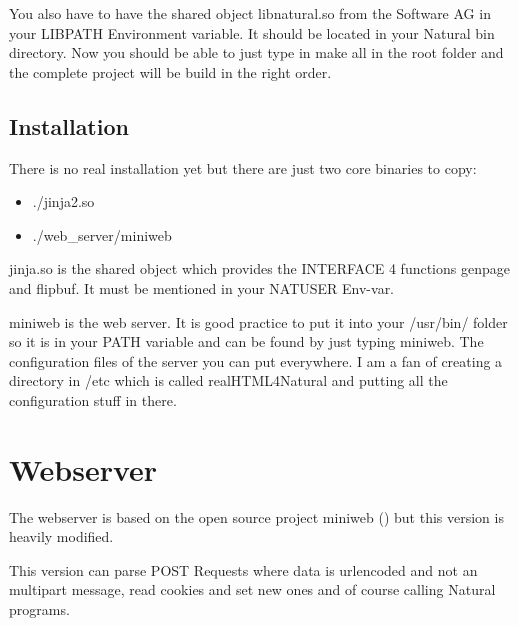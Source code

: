 \documentclass[letterpaper,10pt,english]{sphinxmanual}
\begin{document}
You also have to have the shared object \sphinxquotedblleft{}libnatural.so\sphinxquotedblright{} from the Software AG in your \sphinxquotedblleft{}LIBPATH\sphinxquotedblright{} Environment variable. It should be located in your Natural bin directory.
Now you should be able to just type in \sphinxquotedblleft{}make all\sphinxquotedblright{} in the root folder and the complete project will be build in the right order.


\subsection{Installation}
\label{\detokenize{installation:installation}}
There is no real installation yet but there are just two core binaries to copy:
\begin{itemize}
\item {} 
./jinja2.so

\item {} 
./web\_server/miniweb

\end{itemize}

\sphinxquotedblleft{}jinja.so\sphinxquotedblright{} is the shared object which provides the INTERFACE 4 functions \sphinxquotedblleft{}genpage\sphinxquotedblright{} and \sphinxquotedblleft{}flipbuf\sphinxquotedblright{}. It must be mentioned in your NATUSER Env-var.

\sphinxquotedblleft{}miniweb\sphinxquotedblright{} is the web server. It is good practice to put it into your \sphinxquotedblleft{}/usr/bin/\sphinxquotedblright{} folder so it is in your PATH variable and can be found by just typing \sphinxquotedblleft{}miniweb\sphinxquotedblright{}. The configuration files of the server you can put everywhere.
I am a fan of creating a directory in \sphinxquotedblleft{}/etc\sphinxquotedblright{} which is called \sphinxquotedblleft{}realHTML4Natural\sphinxquotedblright{} and putting all the configuration stuff in there.


\section{Webserver}
\label{\detokenize{webserver:webserver}}\label{\detokenize{webserver::doc}}
The webserver is based on the open source project miniweb () but this version is heavily modified.

This version can parse POST Requests where data is urlencoded and not an multipart message, read cookies and set new ones and of course calling Natural programs.
\end{document}
